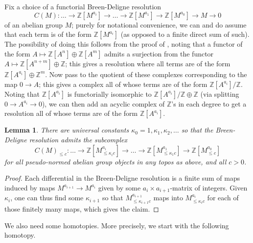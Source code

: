 \documentclass[11pt]{amsbook}
\numberwithin{equation}{section}
\numberwithin{theorem}{section}
\newtheorem{lemma}[theorem]{Lemma}
\theoremstyle{definition}
\begin{document}
Fix a choice of a functorial Breen-Deligne resolution
\[
C(M):\ldots \to \mathbb Z[M^{a_i}]\to\ldots\to\mathbb
Z[M^{a_1}]\to\mathbb Z[M^{a_0}]\to M\to 0
\]
of an abelian group $M$; purely for notational convenience, we can and do assume that each term is of the form $\mathbb Z[M^{a_i}]$ (as opposed to a finite direct sum of such). The possibility of doing this follows from the proof of \cite[Theorem 4.10]{Condensed}, noting that a functor of the form $A\mapsto \mathbb Z[A^n]\oplus \mathbb Z[A^m]$ admits a surjection from the functor $A\mapsto \mathbb Z[A^{n+m}]\oplus \mathbb Z$; this gives a resolution where all terms are of the form $\mathbb Z[A^{a_i}]\oplus \mathbb Z^m$. Now pass to the quotient of these complexes corresponding to the map $0\to A$; this gives a complex all of whose terms are of the form $\mathbb Z[A^{a_i}]/\mathbb Z$. Noting that $\mathbb Z[A^{a_i}]$ is functorially isomorphic to $\mathbb Z[A^{a_i}]/\mathbb Z\oplus \mathbb Z$ (via splitting $0\to A^{a_i}\to 0$), we can then add an acyclic complex of $\mathbb Z$'s in each degree to get a resolution all of whose terms are of the form $\mathbb Z[A^{a_i}]$.

\begin{lemma}\label{lem:constantsdeligne} There are universal constants $\kappa_0=1,\kappa_1,\kappa_2,\ldots$ so that the Breen-Deligne resolution admits the subcomplex
\[
C(M)_{\leq c}: \ldots \to \mathbb Z[M^{a_i}_{\leq \kappa_ic}]\to\ldots\to\mathbb
Z[M^{a_1}_{\leq \kappa_1c}]\to\mathbb Z[M^{a_0}_{\leq c}]
\]
for all pseudo-normed abelian group objects in any topos as above, and all $c>0$.
\end{lemma}

\begin{proof} Each differential in the Breen-Deligne resolution is a finite sum of maps induced by maps $M^{a_{i+1}}\to M^{a_i}$ given by some $a_i\times a_{i+1}$-matrix of integers. Given $\kappa_i$, one can thus find some $\kappa_{i+1}$ so that $M^{a_{i+1}}_{\leq \kappa_{i+1}c}$ maps into $M^{a_i}_{\leq \kappa_ic}$ for each of those finitely many maps, which gives the claim.
\end{proof}

We also need some homotopies. More precisely, we start with the following homotopy.
\end{document}
